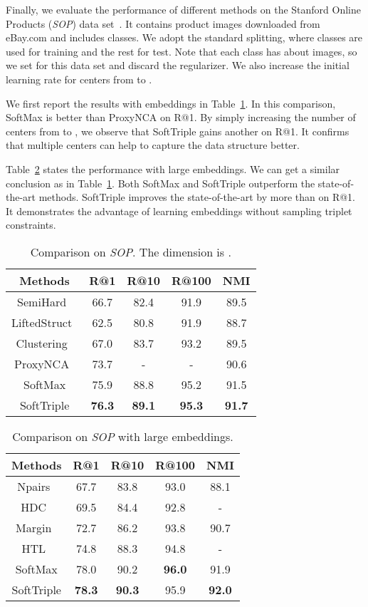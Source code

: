 \documentclass[10pt,twocolumn,letterpaper]{article}
\begin{document}
Finally, we evaluate the performance of different methods on the Stanford Online Products (\textit{SOP}) data set~\cite{SongXJS16}. It contains  product images downloaded from eBay.com and includes  classes. We adopt the standard splitting, where  classes are used for training and the rest for test. Note that each class has about  images, so we set  for this data set and discard the regularizer. We also increase the initial learning rate for centers from  to .

We first report the results with  embeddings in Table~\ref{ta:sop64}. In this comparison, SoftMax is  better than ProxyNCA on R@1. By simply increasing the number of centers from  to , we observe that SoftTriple gains another  on R@1. It confirms that multiple centers can help to capture the data structure better. 

Table~\ref{ta:sop512} states the performance with large embeddings. We can get a similar conclusion as in Table~\ref{ta:sop64}. Both SoftMax and SoftTriple outperform the state-of-the-art methods. SoftTriple improves the state-of-the-art by more than  on R@1. It demonstrates the advantage of learning embeddings without sampling triplet constraints.

\begin{table}[!ht]
\centering
\small
\caption{Comparison on \textit{SOP}. The dimension is .}\label{ta:sop64}
\begin{tabular}{c|cccc}
Methods&R@1&R@10&R@100&NMI\\\hline
SemiHard~\cite{SchroffKP15}&66.7&82.4&91.9&89.5\\
LiftedStruct~\cite{SongXJS16}&62.5&80.8&91.9&88.7\\
Clustering~\cite{SongJR017}&67.0&83.7&93.2&89.5\\
ProxyNCA~\cite{Attias17}&73.7&-&-&90.6\\\hline
SoftMax&75.9&88.8&95.2&91.5\\
SoftTriple&\textbf{76.3}&\textbf{89.1}&\textbf{95.3}&\textbf{91.7}\\
\end{tabular}
\end{table}

\begin{table}[!ht]
\centering
\small
\caption{Comparison on \textit{SOP} with large embeddings.}\label{ta:sop512}
\begin{tabular}{c|cccc}
Methods&R@1&R@10&R@100&NMI\\\hline
Npairs~\cite{Sohn16}&67.7&83.8&93.0&88.1\\
HDC~\cite{YuanYZ17}&69.5&84.4&92.8&-\\
Margin~\cite{ManmathaWSK17}&72.7&86.2&93.8&90.7\\
HTL~\cite{GeHDS18}&74.8&88.3&94.8&-\\\hline
SoftMax&78.0&90.2&\textbf{96.0}&91.9\\
SoftTriple&\textbf{78.3}&\textbf{90.3}&95.9&\textbf{92.0}\\
\end{tabular}
\end{table}
\end{document}
